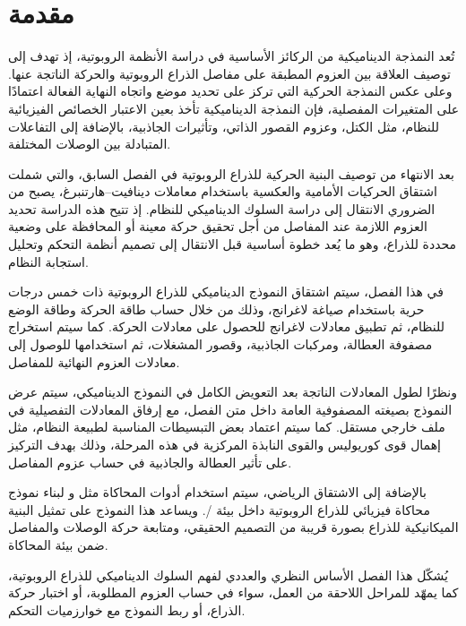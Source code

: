 \section{مقدمة}

تُعد النمذجة الديناميكية من الركائز الأساسية في دراسة الأنظمة الروبوتية، إذ تهدف إلى توصيف العلاقة بين العزوم المطبقة على مفاصل الذراع الروبوتية والحركة الناتجة عنها. وعلى عكس النمذجة الحركية التي تركز على تحديد موضع واتجاه النهاية الفعالة اعتمادًا على المتغيرات المفصلية، فإن النمذجة الديناميكية تأخذ بعين الاعتبار الخصائص الفيزيائية للنظام، مثل الكتل، وعزوم القصور الذاتي، وتأثيرات الجاذبية، بالإضافة إلى التفاعلات المتبادلة بين الوصلات المختلفة.

بعد الانتهاء من توصيف البنية الحركية للذراع الروبوتية في الفصل السابق، والتي شملت اشتقاق الحركيات الأمامية والعكسية باستخدام معاملات دينافيت--هارتنبرغ، يصبح من الضروري الانتقال إلى دراسة السلوك الديناميكي للنظام. إذ تتيح هذه الدراسة تحديد العزوم اللازمة عند المفاصل من أجل تحقيق حركة معينة أو المحافظة على وضعية محددة للذراع، وهو ما يُعد خطوة أساسية قبل الانتقال إلى تصميم أنظمة التحكم وتحليل استجابة النظام.

في هذا الفصل، سيتم اشتقاق النموذج الديناميكي للذراع الروبوتية ذات خمس درجات حرية باستخدام صياغة لاغرانج، وذلك من خلال حساب طاقة الحركة وطاقة الوضع للنظام، ثم تطبيق معادلات لاغرانج للحصول على معادلات الحركة. كما سيتم استخراج مصفوفة العطالة، ومركبات الجاذبية، وقصور المشغلات، ثم استخدامها للوصول إلى معادلات العزوم النهائية للمفاصل.

ونظرًا لطول المعادلات الناتجة بعد التعويض الكامل في النموذج الديناميكي، سيتم عرض النموذج بصيغته المصفوفية العامة داخل متن الفصل، مع إرفاق المعادلات التفصيلية في ملف خارجي مستقل. كما سيتم اعتماد بعض التبسيطات المناسبة لطبيعة النظام، مثل إهمال قوى كوريوليس والقوى النابذة المركزية في هذه المرحلة، وذلك بهدف التركيز على تأثير العطالة والجاذبية في حساب عزوم المفاصل.

بالإضافة إلى الاشتقاق الرياضي، سيتم استخدام أدوات المحاكاة مثل  و  لبناء نموذج محاكاة فيزيائي للذراع الروبوتية داخل بيئة /. ويساعد هذا النموذج على تمثيل البنية الميكانيكية للذراع بصورة قريبة من التصميم الحقيقي، ومتابعة حركة الوصلات والمفاصل ضمن بيئة المحاكاة.

يُشكّل هذا الفصل الأساس النظري والعددي لفهم السلوك الديناميكي للذراع الروبوتية، كما يمهّد للمراحل اللاحقة من العمل، سواء في حساب العزوم المطلوبة، أو اختبار حركة الذراع، أو ربط النموذج مع خوارزميات التحكم.
